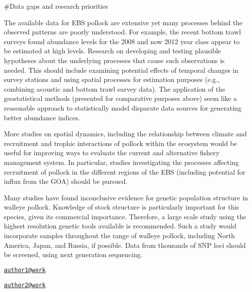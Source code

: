 \#Data gaps and research priorities

The available data for EBS pollock are extensive yet many processes
behind the observed patterns are poorly understood. For example, the
recent bottom trawl surveys found abundance levels for the 2008 and now
2012 year class appear to be estimated at high levels. Research on
developing and testing plausible hypotheses about the underlying
processes that cause such observations is needed. This should include
examining potential effects of temporal changes in survey stations and
using spatial processes for estimation purposes (e.g., combining
acoustic and bottom trawl survey data). The application of the
geostatistical methods (presented for comparative purposes above) seem
like a reasonable approach to statistically model disparate data sources
for generating better abundance indices.

More studies on spatial dynamics, including the relationship between
climate and recruitment and trophic interactions of pollock within the
ecosystem would be useful for improving ways to evaluate the current and
alternative fishery management system. In particular, studies
investigating the processes affecting recruitment of pollock in the
different regions of the EBS (including potential for influx from the
GOA) should be pursued.

Many studies have found inconclusive evidence for genetic population
structure in walleye pollock. Knowledge of stock structure is
particularly important for this species, given its commercial
importance. Therefore, a large scale study using the highest resolution
genetic tools available is recommended. Such a study would incorporate
samples throughout the range of walleye pollock, including North
America, Japan, and Russia, if possible. Data from thousands of SNP loci
should be screened, using next generation sequencing.


\address{%
James Ianelli\\
AFSC\\
line 1\\ line 2\\
}
\href{mailto:author1@work}{\nolinkurl{author1@work}}

\address{%
Author Two\\
Affiliation\\
line 1\\ line 2\\
}
\href{mailto:author2@work}{\nolinkurl{author2@work}}

